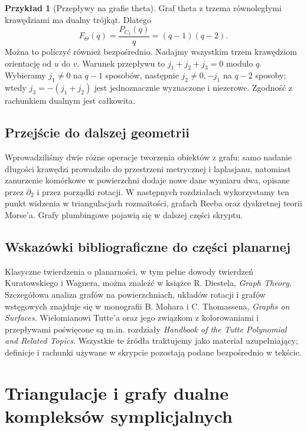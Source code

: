 \documentclass[11pt,a4paper]{report}
\numberwithin{equation}{section}
\theoremstyle{plain}
\theoremstyle{definition}
\newtheorem{przyklad}[twierdzenie]{Przykład}
\theoremstyle{remark}
\begin{document}
\begin{przyklad}[Przepływy na grafie theta]
Graf theta z trzema równoległymi krawędziami ma dualny
trójkąt. Dlatego
\[
 F_{\Theta}(q)=\frac{P_{C_3}(q)}{q}=(q-1)(q-2).
\]
Można to policzyć również bezpośrednio. Nadajmy wszystkim
trzem krawędziom orientację od $u$ do $v$.
Warunek przepływu to $j_1+j_2+j_3=0$ modulo $q$.
Wybieramy $j_1\ne0$ na $q-1$ sposobów, następnie
$j_2\ne0,-j_1$ na $q-2$ sposoby; wtedy
$j_3=-(j_1+j_2)$ jest jednoznacznie wyznaczone i niezerowe.
Zgodność z rachunkiem dualnym jest całkowita.
\end{przyklad}

\section*{Przejście do dalszej geometrii}
Wprowadziliśmy dwie różne operacje tworzenia obiektów
z grafu: samo nadanie długości krawędzi prowadziło
do przestrzeni metrycznej i laplasjanu, natomiast
zanurzenie komórkowe w powierzchni dodaje nowe dane
wymiaru dwa, opisane przez $\partial_2$ i przez porządki
rotacji. W następnych rozdziałach wykorzystamy ten punkt widzenia
w triangulacjach rozmaitości, grafach Reeba oraz dyskretnej
teorii Morse'a. Grafy plumbingowe pojawią się w dalszej części skryptu.

\section*{Wskazówki bibliograficzne do części planarnej}
Klasyczne twierdzenia o planarności, w tym pełne dowody
twierdzeń Kuratowskiego i Wagnera, można znaleźć w książce
R. Diestela, \emph{Graph Theory}. Szczegółowa analiza
grafów na powierzchniach, układów rotacji i grafów wstęgowych
znajduje się w monografii B. Mohara i C. Thomassena,
\emph{Graphs on Surfaces}. Wielomianowi Tutte'a oraz jego
związkom z kolorowaniami i przepływami poświęcone są m.in.
rozdziały \emph{Handbook of the Tutte Polynomial and Related Topics}.
Wszystkie te źródła traktujemy jako materiał uzupełniający;
definicje i rachunki używane w skrypcie pozostają podane
bezpośrednio w tekście.


\chapter{Triangulacje i grafy dualne kompleksów symplicjalnych}
\label{ch:tg-triangulacje}
\end{document}
